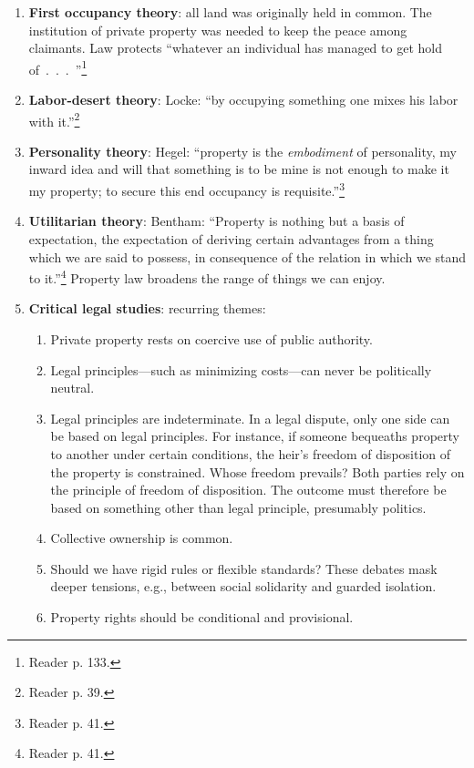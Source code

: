 \begin{enumerate}
    \item \textbf{First occupancy theory}: all land was originally held in 
    common. The institution of private property was needed to keep the peace 
    among claimants. Law protects ``whatever an individual has managed to get 
    hold of~.~.~.~''\footnote{Reader p. 133.}
    \item \textbf{Labor-desert theory}: Locke: ``by occupying something one 
    mixes his labor with it.''\footnote{Reader p. 39.}
    \item \textbf{Personality theory}: Hegel: ``property is the 
    \emph{embodiment} of personality, my inward idea and will that something 
    is to be mine is not enough to make it my property; to secure this end 
    occupancy is requisite.''\footnote{Reader p. 41.}
    \item \textbf{Utilitarian theory}: Bentham: ``Property is nothing but a 
    basis of expectation, the expectation of deriving certain advantages from 
    a thing which we are said to possess, in consequence of the relation in 
    which we stand to it.''\footnote{Reader p. 41.} Property law broadens the 
    range of things we can enjoy.
    \item \textbf{Critical legal studies}: recurring themes:
    \begin{enumerate}
        \item Private property rests on coercive use of public authority.
        \item Legal principles---such as minimizing costs---can never be 
        politically neutral.
        \item Legal principles are indeterminate. In a legal dispute, only one 
        side can be based on legal principles. For instance, if someone 
        bequeaths property to another under certain conditions, the heir's 
        freedom of disposition of the property is constrained. Whose freedom 
        prevails? Both parties rely on the principle of freedom of 
        disposition. The outcome must therefore be based on something other 
        than legal principle, presumably politics.
        \item Collective ownership is common.
        \item Should we have rigid rules or flexible standards? These debates 
        mask deeper tensions, e.g., between social solidarity and guarded 
        isolation.
        \item Property rights should be conditional and provisional.
    \end{enumerate}
\end{enumerate}

